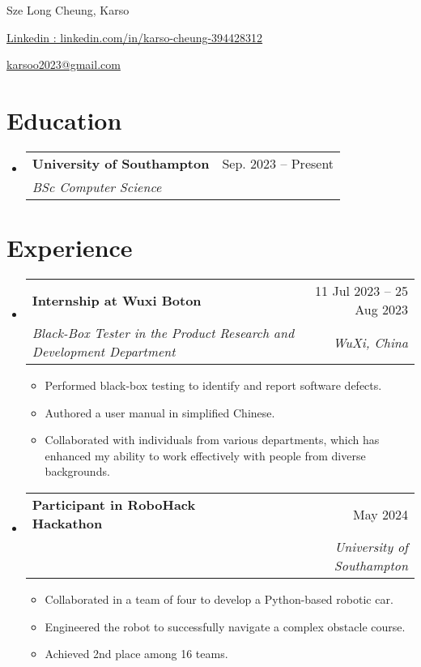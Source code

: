 \documentclass[letterpaper,10pt]{article}
\makeatletter
\newcommand{\resumeItem}[1]{
  \item\small{
    {#1 \vspace{-2pt}}
  }
}
\newcommand{\resumeSubheading}[4]{
  \vspace{-2pt}\item
    \begin{tabular*}{0.97\textwidth}[t]{l@{\extracolsep{\fill}}r}
      \textbf{#1} & #2 \\
      \textit{\small#3} & \textit{\small #4} \\
    \end{tabular*}\vspace{-7pt}
}
\newcommand{\resumeSubHeadingListStart}{\begin{itemize}[leftmargin=0.15in, label={}]}
\newcommand{\resumeSubHeadingListEnd}{\end{itemize}}
\newcommand{\resumeItemListStart}{\begin{itemize}}
\newcommand{\resumeItemListEnd}{\end{itemize}\vspace{-5pt}}
\makeatother
\begin{document}
\begin{center}
    {\LARGE Sze Long Cheung, Karso} \\ \vspace{2pt}
    \begin{multicols}{2}
    \begin{flushleft}
    \href{linkedin.com/in/karso-cheung-394428312}{Linkedin : linkedin.com/in/karso-cheung-394428312}
    \end{flushleft}
    
    \begin{flushright}
    \href{mailto:karsoo2023@gmail.com}{karsoo2023@gmail.com}
    \end{flushright}
    \end{multicols}
\end{center}

\vspace{-2pt}
\section{Education}
  \resumeSubHeadingListStart
    \resumeSubheading
      {University of Southampton}{Sep. 2023 -- Present}
      {BSc Computer Science}{}
  \resumeSubHeadingListEnd

\section{Experience}

\resumeSubHeadingListStart
    \resumeSubheading
      {Internship at Wuxi Boton}{11 Jul 2023 -- 25 Aug 2023}
      {Black-Box Tester in the Product Research and Development Department}{WuXi, China}
      \resumeItemListStart
        \resumeItem{Performed black-box testing to identify and report software defects.}
        \resumeItem{Authored a user manual in simplified Chinese.}
        \resumeItem{Collaborated with individuals from various departments, which has enhanced my ability to work effectively with people from diverse backgrounds.}
      \resumeItemListEnd
\resumeSubHeadingListEnd

\resumeSubHeadingListStart
    \resumeSubheading
      {Participant in RoboHack Hackathon}{May 2024}
      {}{University of Southampton}
      \resumeItemListStart
        \resumeItem{Collaborated in a team of four to develop a Python-based robotic car.}
        \resumeItem{Engineered the robot to successfully navigate a complex obstacle course.}
        \resumeItem{Achieved 2nd place among 16 teams.}
      \resumeItemListEnd
\resumeSubHeadingListEnd
\end{document}
